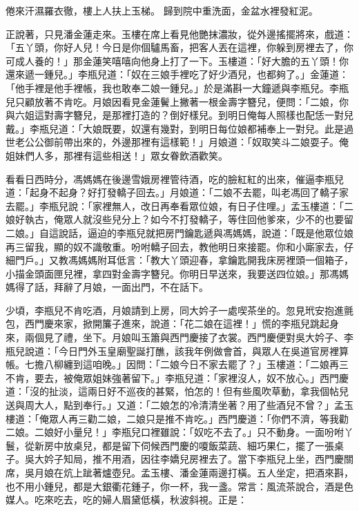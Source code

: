 倦來汗濕羅衣徹，樓上人扶上玉梯。
歸到院中重洗面，金盆水裡發紅泥。

正說著，只見潘金蓮走來。玉樓在席上看見他艷抹濃妝，從外邊搖擺將來，戲道：「五丫頭，你好人兒！今日是你個驢馬畜，把客人丟在這裡，你躲到房裡去了，你可成人養的！」那金蓮笑嘻嘻向他身上打了一下。玉樓道：「好大膽的五丫頭！你還來遞一鍾兒。」李瓶兒道：「奴在三娘手裡吃了好少酒兒，也都夠了。」金蓮道：「他手裡是他手裡帳，我也敢奉二娘一鍾兒。」於是滿斟一大鐘遞與李瓶兒。李瓶兒只顧放著不肯吃。月娘因看見金蓮鬢上撇著一根金壽字簪兒，便問：「二娘，你與六姐這對壽字簪兒，是那裡打造的？倒好樣兒。到明日俺每人照樣也配恁一對兒戴。」李瓶兒道：「大娘既要，奴還有幾對，到明日每位娘都補奉上一對兒。此是過世老公公御前帶出來的，外邊那裡有這樣範！」月娘道：「奴取笑斗二娘耍子。俺姐妹們人多，那裡有這些相送！」眾女眷飲酒歡笑。

看看日西時分，馮媽媽在後邊雪娥房裡管待酒，吃的臉紅紅的出來，催逼李瓶兒道：「起身不起身？好打發轎子回去。」月娘道：「二娘不去罷，叫老馮回了轎子家去罷。」李瓶兒說：「家裡無人，改日再奉看眾位娘，有日子住哩。」孟玉樓道：「二娘好執古，俺眾人就沒些兒分上？如今不打發轎子，等住回他爹來，少不的也要留二娘。」自這說話，逼迫的李瓶兒就把房門鑰匙遞與馮媽媽，說道：「既是他眾位娘再三留我，顯的奴不識敬重。吩咐轎子回去，教他明日來接罷。你和小廝家去，仔細門戶。」又教馮媽媽附耳低言：「教大丫頭迎春，拿鑰匙開我床房裡頭一個箱子，小描金頭面匣兒裡，拿四對金壽字簪兒。你明日早送來，我要送四位娘。」那馮媽媽得了話，拜辭了月娘，一面出門，不在話下。

少頃，李瓶兒不肯吃酒，月娘請到上房，同大妗子一處喫茶坐的。忽見玳安抱進氈包，西門慶來家，掀開簾子進來，說道：「花二娘在這裡！」慌的李瓶兒跳起身來，兩個見了禮，坐下。月娘叫玉簫與西門慶接了衣裳。西門慶便對吳大妗子、李瓶兒說道：「今日門外玉皇廟聖誕打醮，該我年例做會首，與眾人在吳道官房裡算帳。七擔八柳纏到這咱晚。」因問：「二娘今日不家去罷了？」玉樓道：「二娘再三不肯，要去，被俺眾姐妹強著留下。」李瓶兒道：「家裡沒人，奴不放心。」西門慶道：「沒的扯淡，這兩日好不巡夜的甚緊，怕怎的！但有些風吹草動，拿我個帖兒送與周大人，點到奉行。」又道：「二娘怎的冷清清坐著？用了些酒兒不曾？」孟玉樓道：「俺眾人再三勸二娘，二娘只是推不肯吃。」西門慶道：「你們不濟，等我勸二娘。二娘好小量兒！」李瓶兒口裡雖說：「奴吃不去了。」只不動身。一面吩咐丫鬟，從新房中放桌兒，都是留下伺候西門慶的嗄飯菜蔬、細巧果仁，擺了一張桌子。吳大妗子知局，推不用酒，因往李嬌兒房裡去了。當下李瓶兒上坐，西門慶關席，吳月娘在炕上跐著爐壺兒。孟玉樓、潘金蓮兩邊打橫。五人坐定，把酒來斟，也不用小鍾兒，都是大銀衢花鍾子，你一杯，我一盞。常言：風流茶說合，酒是色媒人。吃來吃去，吃的婦人眉黛低橫，秋波斜視。正是：

